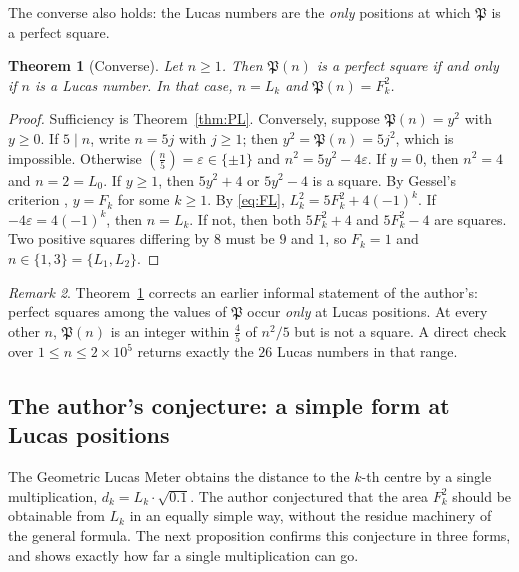 \documentclass[11pt,a4paper]{article}
\newcommand{\Pent}{\mathfrak{P}}                      %
\newcommand{\leg}[1]{\left(\tfrac{#1}{5}\right)}      %
\theoremstyle{plain}
\newtheorem{theorem}{Theorem}[section]
\theoremstyle{definition}
\theoremstyle{remark}
\newtheorem{remark}[theorem]{Remark}
\begin{document}
The converse also holds: the Lucas numbers are the \emph{only} positions at which $\Pent$ is a perfect square.

\begin{theorem}[Converse]\label{thm:converse}
Let $n\ge1$. Then $\Pent(n)$ is a perfect square if and only if $n$ is a Lucas number. In that case, $n=L_k$ and $\Pent(n)=F_k^{2}$.
\end{theorem}

\begin{proof}
Sufficiency is Theorem~\ref{thm:PL}. Conversely, suppose $\Pent(n)=y^{2}$ with $y\ge0$.
If $5\mid n$, write $n=5j$ with $j\ge1$; then $y^{2}=\Pent(n)=5j^{2}$, which is impossible.
Otherwise $\leg{n}=\varepsilon\in\{\pm1\}$ and $n^{2}=5y^{2}-4\varepsilon$.
If $y=0$, then $n^{2}=4$ and $n=2=L_0$.
If $y\ge1$, then $5y^{2}+4$ or $5y^{2}-4$ is a square. By Gessel's criterion \cite{Gessel1971,Koshy2001}, $y=F_k$ for some $k\ge1$. By \eqref{eq:FL}, $L_k^{2}=5F_k^{2}+4(-1)^{k}$. If $-4\varepsilon=4(-1)^{k}$, then $n=L_k$. If not, then both $5F_k^{2}+4$ and $5F_k^{2}-4$ are squares. Two positive squares differing by $8$ must be $9$ and $1$, so $F_k=1$ and $n\in\{1,3\}=\{L_1,L_2\}$.
\end{proof}

\begin{remark}
Theorem~\ref{thm:converse} corrects an earlier informal statement of the author's: perfect squares among the values of $\Pent$ occur \emph{only} at Lucas positions. At every other $n$, $\Pent(n)$ is an integer within $\tfrac45$ of $n^{2}/5$ but is not a square. A direct check over $1\le n\le 2\times10^{5}$ returns exactly the $26$ Lucas numbers in that range.
\end{remark}


\subsection{The author's conjecture: a simple form at Lucas positions}\label{sec:conjecture}

The Geometric Lucas Meter obtains the distance to the $k$-th centre by a single multiplication, $d_k=L_k\cdot\sqrt{0.1}$. The author conjectured that the area $F_k^{2}$ should be obtainable from $L_k$ in an equally simple way, without the residue machinery of the general formula. The next proposition confirms this conjecture in three forms, and shows exactly how far a single multiplication can go.
\end{document}
